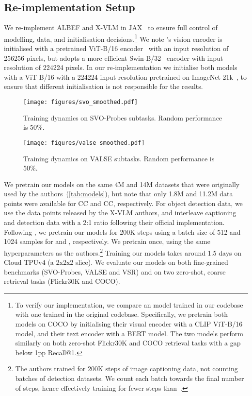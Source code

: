 \subsection{Re-implementation Setup} \label{app:reimplement}
We re-implement ALBEF and X-VLM in JAX~\citep{dm_jax} to ensure full control of modelling, data, and initialisation decisions.\footnote{To verify our implementation, we compare an \albef model trained in our codebase with one trained in the original codebase. Specifically, we pretrain both models on COCO by initialising their visual encoder with a CLIP ViT-B/16 model, and their text encoder with a BERT model. The two models perform similarly on both zero-shot Flickr30K and COCO retrieval tasks with a gap below 1pp Recall@1.}
We note \albef's vision encoder is initialised with a pretrained ViT-B/16 encoder~\citep{deit} with an input resolution of 256256 pixels, but \xvlm adopts a more efficient Swin-B/32~\cite{swin} encoder with input resolution of 224224 pixels.
In our re-implementation we initialise both models with a ViT-B/16 with a 224224 input resolution pretrained on ImageNet-21k~\cite{vit_augreg}, to ensure that different initialisation is not responsible for the results.

\begin{figure*}[t!]
    \centering
    \texttt{[image: figures/svo\_smoothed.pdf]}
    \vspace{-7mm}
    \caption{Training dynamics on SVO-Probes subtasks. Random performance is 50\%.}\label{fig:svo_dynamics}
\end{figure*}

\begin{figure*}[t!]
    \centering
    \texttt{[image: figures/valse\_smoothed.pdf]}
    \vspace{-7mm}
    \caption{Training dynamics on VALSE subtasks. Random performance is 50\%.}\label{fig:valse_dynamics}
\end{figure*}

We pretrain our models on the same 4M and 14M datasets that were originally used by the authors~(\cref{tab:models}), but note that only 1.8M and 11.2M data points were available for CC and CC, respectively.
For object detection data, we use the data points released by the X-VLM authors, and interleave captioning and detection data with a 2:1 ratio following their official implementation.
Following \cite{x-vlm}, we pretrain our models for 200K steps using a batch size of 512 and 1024 samples for \albef and \xvlm, respectively. We pretrain once, using the same hyperparameters as the authors.\footnote{The \xvlm authors trained for 200K steps of image captioning data, not counting batches of detection datasets. We count each batch towards the final number of steps, hence effectively training for fewer steps than~\citet{x-vlm}.}
Training our models takes around 1.5 days on Cloud TPUv4 (a 2x2x2 slice).
We evaluate our models on both fine-grained benchmarks (SVO-Probes, VALSE and VSR) and on two zero-shot, coarse retrieval tasks (Flickr30K and COCO).
